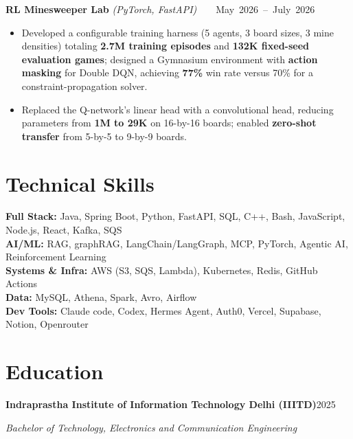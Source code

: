 \documentclass[10pt,letterpaper]{article}
\newcommand{\resumeHeading}[4]{%
  \par\noindent\textbf{#1}\hfill\mbox{#2}\par
  \noindent\textit{#3}\hfill\mbox{\textit{#4}}\par
}
\newcommand{\projectHeading}[3]{%
  \par\noindent\textbf{#1} \textit{(#2)}\hfill\mbox{#3}\par
}
\begin{document}
\projectHeading{RL Minesweeper Lab}{PyTorch, FastAPI}{\scriptsize\href{https://github.com/dreddak47/RL-Minesweeper-Lab}{\faGithub}\ \textbar\ \href{https://rl-minesweeper-lab.vercel.app/}{\faExternalLink}\ \textbar\ \normalsize May 2026 -- July 2026}
\begin{itemize}
  \item Developed a configurable training harness (5 agents, 3 board sizes, 3 mine densities) totaling \textbf{2.7M training episodes} and \textbf{132K fixed-seed evaluation games}; designed a Gymnasium environment with \textbf{action masking} for Double DQN, achieving \textbf{77\%} win rate versus 70\% for a constraint-propagation solver.
  \item Replaced the Q-network's linear head with a convolutional head, reducing parameters from \textbf{1M to 29K} on 16-by-16 boards; enabled \textbf{zero-shot transfer} from 5-by-5 to 9-by-9 boards.
\end{itemize}

\section{Technical Skills}
\textbf{Full Stack:} Java, Spring Boot, Python, FastAPI, SQL, C++, Bash, JavaScript, Node.js, React, Kafka, SQS \\[-1pt]
\textbf{AI/ML:} RAG, graphRAG, LangChain/LangGraph, MCP, PyTorch, Agentic AI, Reinforcement Learning \\[-1pt]
\textbf{Systems \& Infra:} AWS (S3, SQS, Lambda), Kubernetes, Redis, GitHub Actions \\[-1pt]
\textbf{Data:} MySQL, Athena, Spark, Avro, Airflow \\[-1pt]
\textbf{Dev Tools:} Claude code, Codex, Hermes Agent, Auth0, Vercel, Supabase, Notion, Openrouter \\[-1pt]

\section{Education}
\resumeHeading
  {Indraprastha Institute of Information Technology Delhi (IIITD)}
  {2025}
  {Bachelor of Technology, Electronics and Communication Engineering}
  {}
\end{document}
